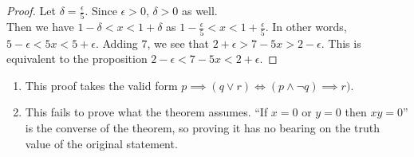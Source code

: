 \documentclass[12pt]{scrartcl} %
\begin{document}
	\begin{proof}
		Let $\delta = \frac{\epsilon}{5}$. Since $\epsilon > 0$, $\delta > 0$ as well. \\Then we have $1 - \delta < x < 1 + \delta$ as $1 - \frac{\epsilon}{5} < x < 1 + \frac{\epsilon}{5}$. In other words, $5 - \epsilon < 5x < 5 + \epsilon$. Adding $7$, we see that $2 + \epsilon > 7 - 5x > 2 - \epsilon$. This is equivalent to the proposition $2 - \epsilon < 7 - 5x < 2 + \epsilon$.
	\end{proof}

\begin{enumerate}
	\item This proof takes the valid form $p \implies (q \lor r) \iff (p \land \neg q) \implies r)$.
	\item This fails to prove what the theorem assumes. ``If $x = 0$ or $y = 0$ then $xy = 0$'' is the converse of the theorem, so proving it has no bearing on the truth value of the original statement.
\end{enumerate}
\end{document}
